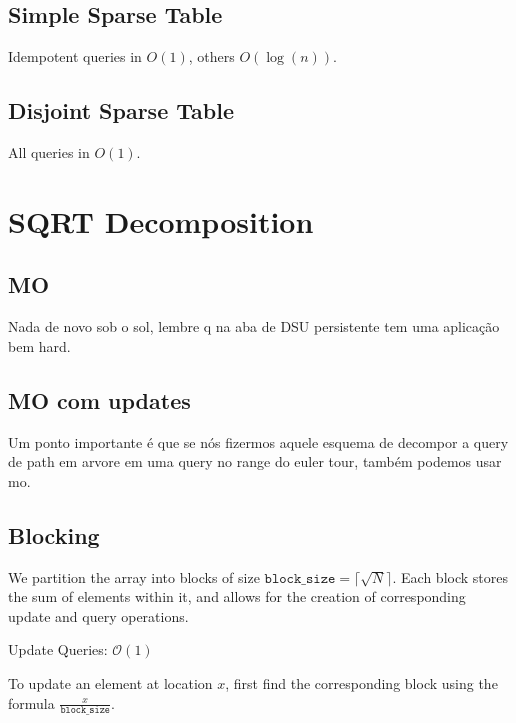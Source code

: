     \subsection{Simple Sparse Table}
    \tab Idempotent queries in $O(1)$, others $O(\log (n))$.
    
    \subsection{Disjoint Sparse Table}
    \tab All queries in $O(1)$.
    
    \section{SQRT Decomposition}
        \subsection{MO}
        \tab Nada de novo sob o sol, lembre q na aba de DSU persistente tem uma aplicação bem hard.
         
        \subsection{MO com updates}
        \tab Um ponto importante é que se nós fizermos aquele esquema de decompor a query de path em arvore em uma query no range do euler tour, também podemos usar mo.
        
        \subsection{Blocking}
        \tab We partition the array into blocks of size $\texttt{block\_size}=\lceil \sqrt{N} \rceil$. Each block stores the sum of elements within it, and allows for the
        creation of corresponding update and query operations.
        
        Update Queries: $\mathcal{O}(1)$
        
        To update an element at location $x$, first find the corresponding block using
        the formula $\frac{x}{\texttt{block\_size}}$.
        
